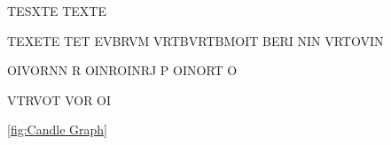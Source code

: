 TESXTE TEXTE 



TEXETE 
 TET EVBRVM
 VRTBVRTBMOIT
 BERI NIN
 VRTOVIN

 OIVORNN R
 OINROINRJ P
 OINORT O



 VTRVOT VOR OI


 \cref{fig:Candle Graph}